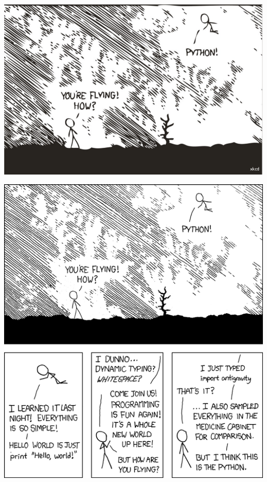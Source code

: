 \documentclass{beamer}
\begin{document}
\begin{frame}{}
    \begin{center}
        \includegraphics[scale=0.3]{python.png}
    \end{center}
\end{frame}
\begin{frame}{}
    \begin{center}
        \includegraphics[scale=0.35]{python2.png}
    \end{center}
\end{frame}
\end{document}
